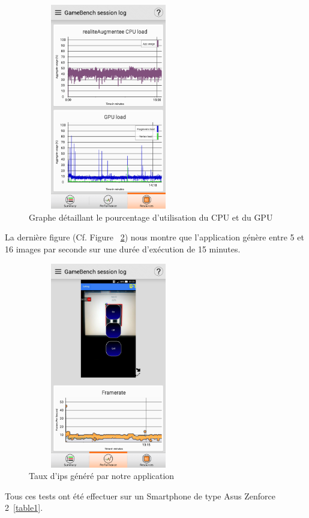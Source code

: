 \documentclass[12pt,a4paper]{article}
\begin{document}
\begin{figure}[H]
  \centering
    \includegraphics[width = 7cm,height=9cm]{test_gamebench_2.png}
     \caption{Graphe détaillant le pourcentage d'utilisation du CPU et du GPU }
     \label{graphe}
\end{figure}
La dernière figure (Cf. Figure ~\ref{ips}) nous montre que l'application génère entre 5 et 16 images par seconde sur une durée d'exécution de 15 minutes.\par
\begin{figure}[H]
  \centering
    \includegraphics[width = 7cm,height=9cm]{test_gamebench_3.png}
     \caption{Taux d'ips généré par notre application 
      }
      \label{ips}
\end{figure}
Tous ces tests ont été effectuer sur un Smartphone de type Asus Zenforce 2~\ref{table1}.\par
\end{document}
